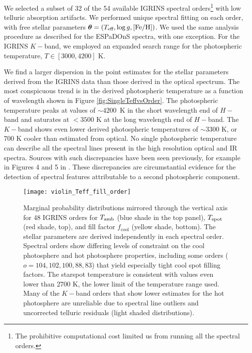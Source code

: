 \documentclass[twocolumn]{emulateapj}%
\begin{document}
We selected a subset of 32 of the 54 available IGRINS spectral orders\footnote{The prohibitive computational cost limited us from running all the spectral orders.} with low telluric absorption artifacts.  We performed unique spectral fitting on each order, with free stellar parameters ${\bm \theta} = (T_\textrm{eff}, \log g, [{\rm Fe}/{\rm H}])$.  We used the same analysis procedure as described for the ESPaDOnS spectra, with one exception.  For the IGRINS $K-$band, we employed an expanded search range for the photospheric temperature, $T \in [3000, 4200]$ K.

We find a larger dispersion in the point estimates for the stellar parameters derived from the IGRINS data than those derived in the optical spectrum.  The most conspicuous trend is in the derived photospheric temperature as a function of wavelength shown in Figure \ref{fig:SingleTeffvsOrder}.  The photospheric temperature peaks at values of $\sim4200$~K in the short wavelength end of $H-$band and saturates at $<3500$ K at the long wavelength end of $H-$band.  The $K-$band shows even lower derived photospheric temperatures of $\sim3300$ K, or 700 K cooler than estimated from optical.  No single photospheric temperature can describe all the spectral lines present in the high resolution optical and IR spectra.  
Sources with such discrepancies have been seen previously, for example in Figures 4 and 5 in \citet{bouvier92}.  These discrepancies are circumstantial evidence for the detection of spectral features attributable to a second photospheric component.


\begin{figure*}
 \centering
 \texttt{[image: violin\_Teff\_fill\_order]} 
 \caption{Marginal probability distributions mirrored through the vertical axis \citep[``Violin plot'']{waskom14} for 48 IGRINS orders for $T_\textrm{amb}$ (blue shade in the top panel), $T_\textrm{spot}$ (red shade, top), and fill factor $f_{\mathrm{cool}}$ (yellow shade, bottom).  The stellar parameters are derived independently in each spectral order.  Spectral orders show differing levels of constraint on the cool photosphere and hot photosphere properties, including some orders ($o=104, 102, 100, 88, 83$) that yield especially tight cool spot filling factors.  The starspot temperature is consistent with values even lower than 2700 K, the lower limit of the temperature range used.  Many of the $K-$band orders that show lower estimates for the hot photosphere are unreliable due to spectral line outliers and uncorrected telluric residuals (light shaded distributions).}
 \label{fig:TwoTempResults}
\end{figure*}
\end{document}
